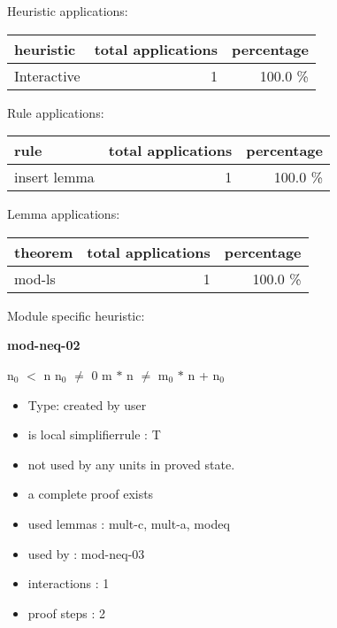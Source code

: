 \documentclass[a4paper]{article}
\begin{document}
\medskip


Heuristic applications:

\begin{supertabular}{l|r|r}
heuristic	& total applications & percentage \\ \hline
Interactive & 1 & 100.0 \% \\

\end{supertabular}

Rule applications:

\begin{supertabular}{l|r|r}
rule	        & total applications & percentage \\ \hline
insert lemma & 1 & 100.0 \% \\

\end{supertabular}

Lemma applications:

\begin{supertabular}{l|r|r}
theorem	        & total applications & percentage \\ \hline
mod-ls & 1 & 100.0 \% \\

\end{supertabular}

Module specific heuristic:

\pagebreak

{\LARGE\bf mod-neq-02}\label{lemma-mod-neq-02}

\medskip

 \Fol $\mbox{n}_{0}$ $<$ n \And $\mbox{n}_{0}$ $\neq$ 0 \Imp m $*$ n $\neq$ $\mbox{m}_{0}$ $*$ n + $\mbox{n}_{0}$

\begin{itemize}

\item Type: created by user

\item is local simplifierrule : T
\item not used by any units in proved state.
\item       a complete proof exists
\item       used lemmas  : mult-c, mult-a, modeq
\item       used by      : mod-neq-03
\item       interactions : 1
\item       proof steps  : 2
\end{itemize}
\end{document}
